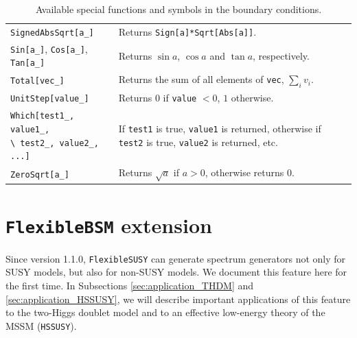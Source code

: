 \documentclass[final,3p,11pt,pdflatex]{elsarticle}
\makeatletter
\newcommand{\modelname}[1]{\texttt{#1}\@\xspace}
\newcommand{\fs}{\texttt{FlexibleSUSY}\@\xspace}
\newcommand{\HSSUSY}{\modelname{HSSUSY}}
\newcommand{\fbsm}{\texttt{FlexibleBSM}\@\xspace}
\newcommand{\code}[1]{\lstinline|#1|}  %
\newcommand{\multilinecell}[2][c]{%
  \begin{tabular}[#1]{@{}c@{}}#2\end{tabular}}
\makeatother
\begin{document}
\begin{table}[h!]
{\begin{tabularx}{1.05\textwidth}{lX}
    \code{SignedAbsSqrt[a_]} &
    Returns \code{Sign[a]*Sqrt[Abs[a]]}. \\

    \code{Sin[a_]}, \code{Cos[a_]}, \code{Tan[a_]} &
    Returns $\sin a$, $\cos a$ and $\tan a$, respectively. \\

    \code{Total[vec_]} &
    Returns the sum of all elements of \code{vec}, $\sum_i v_i$. \\

    \code{UnitStep[value_]} &
    Returns $0$ if \code{value} $<0$, $1$ otherwise. \\

    \multilinecell[t]{\code{Which[test1_, value1_,}\\\code{\ test2_, value2_, ...]}} &
    If \code{test1} is true, \code{value1} is returned, otherwise
    if \code{test2} is true, \code{value2} is returned, etc. \\

    \code{ZeroSqrt[a_]} &
    Returns $\sqrt{a}$ if $a>0$, otherwise returns $0$. \\

    \bottomrule
  \end{tabularx}}
  \caption{Available special functions and symbols in the boundary conditions.}
  \label{tab:bcs_functions}
\end{table}

\section{\fbsm extension}
\label{sec:fbsm}

Since version 1.1.0, \fs can generate spectrum generators not
only for SUSY models, but also for non-SUSY models.  We document this
feature here for the first time.  In Subsections
\ref{sec:application_THDM} and \ref{sec:application_HSSUSY}, we will
describe important applications of this feature to the two-Higgs
doublet model and to an effective low-energy theory of the MSSM
(\HSSUSY).
\end{document}

